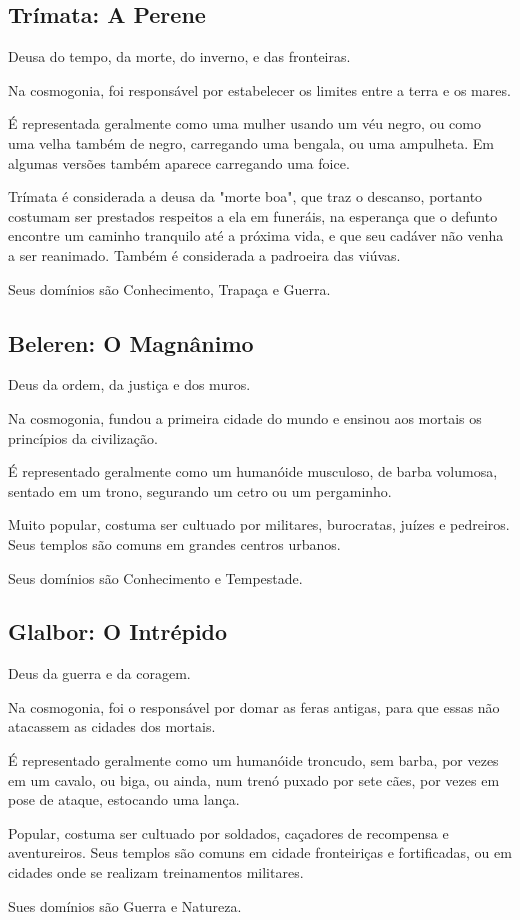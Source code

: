 \documentclass[letterpaper,twocolumn,openany]{dndbook}
\begin{document}
	\subsection{Trímata: A Perene}
	Deusa do tempo, da morte, do inverno, e das fronteiras. 
	\par Na cosmogonia, foi responsável por estabelecer os limites entre a terra e os mares.
	\par É representada geralmente como uma mulher usando um véu negro, ou como uma velha também de negro, carregando uma bengala, ou uma ampulheta. Em algumas versões também aparece carregando uma foice.
	\par Trímata é considerada a deusa da "morte boa", que traz o descanso, portanto costumam ser prestados respeitos a ela em funeráis, na esperança que o defunto encontre um caminho tranquilo até a próxima vida, e que seu cadáver não venha a ser reanimado. Também é considerada a padroeira das viúvas.
	\par Seus domínios são Conhecimento, Trapaça e Guerra.
	
	\subsection{Beleren: O Magnânimo}
	Deus da ordem, da justiça e dos muros.
	\par Na cosmogonia, fundou a primeira cidade do mundo e ensinou aos mortais os princípios da civilização.
	\par É representado geralmente como um humanóide musculoso, de barba volumosa, sentado em um trono, segurando um cetro ou um pergaminho.
	\par Muito popular, costuma ser cultuado por militares, burocratas, juízes e pedreiros. Seus templos são comuns em grandes centros urbanos.
	\par Seus domínios são Conhecimento e Tempestade.
	
	\subsection{Glalbor: O Intrépido}
	Deus da guerra e da coragem.
	\par Na cosmogonia, foi o responsável por domar as feras antigas, para que essas não atacassem as cidades dos mortais.
	\par É representado geralmente como um humanóide troncudo, sem barba, por vezes em um cavalo, ou biga, ou ainda, num trenó puxado por sete cães, por vezes em pose de ataque, estocando uma lança.
	\par Popular, costuma ser cultuado por soldados, caçadores de recompensa e aventureiros. Seus templos são comuns em cidade fronteiriças e fortificadas, ou em cidades onde se realizam treinamentos militares.
	\par Sues domínios são Guerra e Natureza.
	
\end{document}
